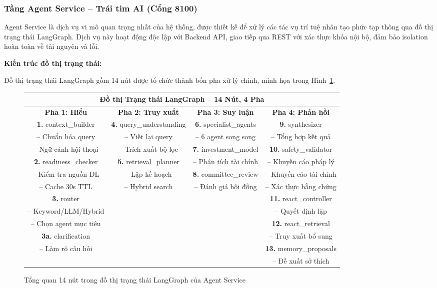 \subsubsection{Tầng Agent Service -- Trái tim AI (Cổng 8100)}

Agent Service là dịch vụ vi mô quan trọng nhất của hệ thống, được thiết kế để xử lý các tác vụ trí tuệ nhân tạo phức tạp thông qua đồ thị trạng thái LangGraph. Dịch vụ này hoạt động độc lập với Backend API, giao tiếp qua REST với xác thực khóa nội bộ, đảm bảo isolation hoàn toàn về tài nguyên và lỗi.

\textbf{Kiến trúc đồ thị trạng thái:}

Đồ thị trạng thái LangGraph gồm 14 nút được tổ chức thành bốn pha xử lý chính, minh họa trong Hình~\ref{fig:agent-graph}.

\begin{figure}[H]
    \centering
    \begin{tabular}{|c|c|c|c|}
        \hline
        \multicolumn{4}{|c|}{\textbf{Đồ thị Trạng thái LangGraph -- 14 Nút, 4 Pha}} \\
        \hline
        \textbf{Pha 1: Hiểu} & \textbf{Pha 2: Truy xuất} & \textbf{Pha 3: Suy luận} & \textbf{Pha 4: Phản hồi} \\
        \hline
        \textbf{1.} context\_builder & \textbf{4.} query\_understanding & \textbf{6.} specialist\_agents & \textbf{9.} synthesizer \\
        \quad -- Chuẩn hóa query & \quad -- Viết lại query & \quad -- 6 agent song song & \quad -- Tổng hợp kết quả \\
        \quad -- Ngữ cảnh hội thoại & \quad -- Trích xuất bộ lọc & \textbf{7.} investment\_model & \textbf{10.} safety\_validator \\
        \hline
        \textbf{2.} readiness\_checker & \textbf{5.} retrieval\_planner & \quad -- Phân tích tài chính & \quad -- Khuyến cáo pháp lý \\
        \quad -- Kiểm tra nguồn DL & \quad -- Lập kế hoạch & \textbf{8.} committee\_review & \quad -- Khuyến cáo tài chính \\
        \quad -- Cache 30s TTL & \quad -- Hybrid search & \quad -- Đánh giá hội đồng & \quad -- Xác thực bằng chứng \\
        \hline
        \textbf{3.} router & & & \textbf{11.} react\_controller \\
        \quad -- Keyword/LLM/Hybrid & & & \quad -- Quyết định lặp \\
        \quad -- Chọn agent mục tiêu & & & \textbf{12.} react\_retrieval \\
        \textbf{3a.} clarification & & & \quad -- Truy xuất bổ sung \\
        \quad -- Làm rõ câu hỏi & & & \textbf{13.} memory\_proposals \\
        & & & \quad -- Đề xuất sở thích \\
        \hline
    \end{tabular}
    \caption{Tổng quan 14 nút trong đồ thị trạng thái LangGraph của Agent Service}
    \label{fig:agent-graph}
\end{figure}

